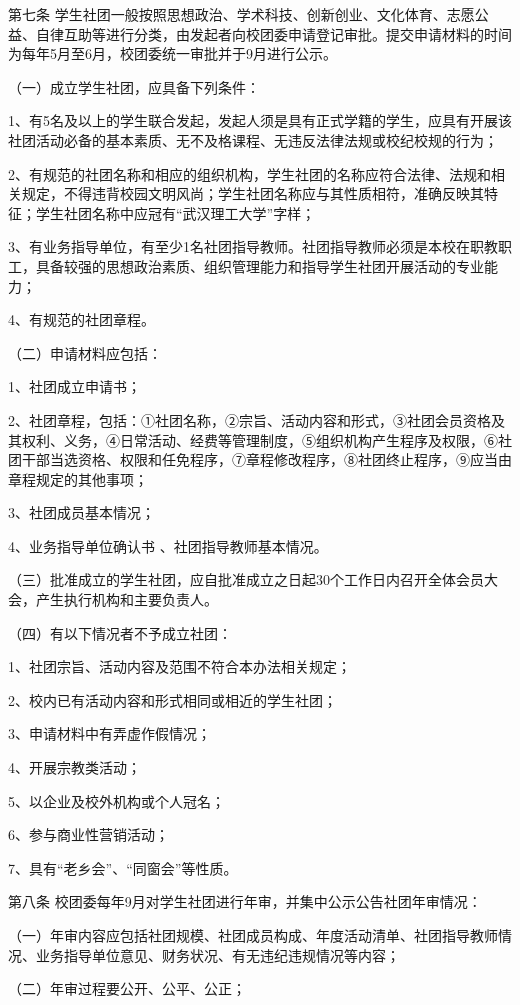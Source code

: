 \documentclass[UTF8,12pt,a4paper]{report}
\begin{document}
第七条  学生社团一般按照思想政治、学术科技、创新创业、文化体育、志愿公益、自律互助等进行分类，由发起者向校团委申请登记审批。提交申请材料的时间为每年5月至6月，校团委统一审批并于9月进行公示。

（一）成立学生社团，应具备下列条件：

1、有5名及以上的学生联合发起，发起人须是具有正式学籍的学生，应具有开展该社团活动必备的基本素质、无不及格课程、无违反法律法规或校纪校规的行为；

2、有规范的社团名称和相应的组织机构，学生社团的名称应符合法律、法规和相关规定，不得违背校园文明风尚；学生社团名称应与其性质相符，准确反映其特征；学生社团名称中应冠有“武汉理工大学”字样；

3、有业务指导单位，有至少1名社团指导教师。社团指导教师必须是本校在职教职工，具备较强的思想政治素质、组织管理能力和指导学生社团开展活动的专业能力；

4、有规范的社团章程。

（二）申请材料应包括：

1、社团成立申请书；

2、社团章程，包括：①社团名称，②宗旨、活动内容和形式，③社团会员资格及其权利、义务，④日常活动、经费等管理制度，⑤组织机构产生程序及权限，⑥社团干部当选资格、权限和任免程序，⑦章程修改程序，⑧社团终止程序，⑨应当由章程规定的其他事项；

3、社团成员基本情况；

4、业务指导单位确认书 、社团指导教师基本情况。

（三）批准成立的学生社团，应自批准成立之日起30个工作日内召开全体会员大会，产生执行机构和主要负责人。

（四）有以下情况者不予成立社团：

1、社团宗旨、活动内容及范围不符合本办法相关规定；

2、校内已有活动内容和形式相同或相近的学生社团；

3、申请材料中有弄虚作假情况；

4、开展宗教类活动；

5、以企业及校外机构或个人冠名；

6、参与商业性营销活动；

7、具有“老乡会”、“同窗会”等性质。

第八条  校团委每年9月对学生社团进行年审，并集中公示公告社团年审情况：

（一）年审内容应包括社团规模、社团成员构成、年度活动清单、社团指导教师情况、业务指导单位意见、财务状况、有无违纪违规情况等内容；

（二）年审过程要公开、公平、公正；
\end{document}
